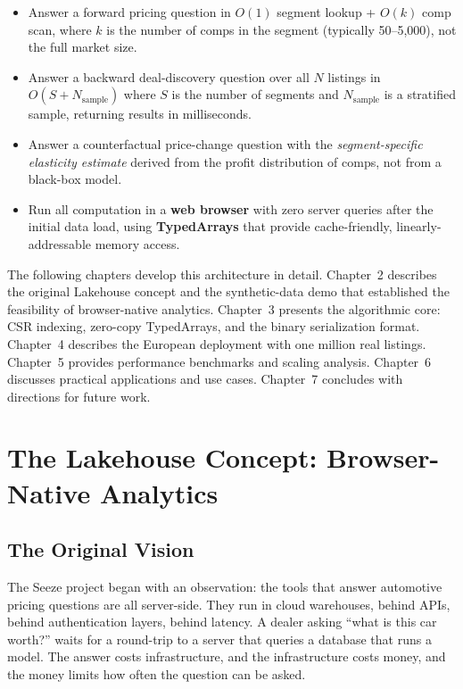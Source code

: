 \documentclass[11pt,a4paper,twoside]{book}
\begin{document}
\begin{itemize}[leftmargin=*]
    \item Answer a forward pricing question in $O(1)$ segment lookup + $O(k)$ comp scan, where
          $k$ is the number of comps in the segment (typically 50--5,000), not the full market
          size.
    \item Answer a backward deal-discovery question over all $N$ listings in $O(S + N_{\text{sample}})$
          where $S$ is the number of segments and $N_{\text{sample}}$ is a stratified sample,
          returning results in milliseconds.
    \item Answer a counterfactual price-change question with the \textit{segment-specific
          elasticity estimate} derived from the profit distribution of comps, not from a
          black-box model.
    \item Run all computation in a \textbf{web browser} with zero server queries after the
          initial data load, using \textbf{TypedArrays} that provide cache-friendly,
          linearly-addressable memory access.
\end{itemize}

The following chapters develop this architecture in detail. Chapter~2 describes the original
Lakehouse concept and the synthetic-data demo that established the feasibility of browser-native
analytics. Chapter~3 presents the algorithmic core: CSR indexing, zero-copy TypedArrays, and the
binary serialization format. Chapter~4 describes the European deployment with one million real
listings. Chapter~5 provides performance benchmarks and scaling analysis. Chapter~6 discusses
practical applications and use cases. Chapter~7 concludes with directions for future work.

\chapter{The Lakehouse Concept: Browser-Native Analytics}

\section{The Original Vision}

The Seeze project began with an observation: the tools that answer automotive pricing questions
are all server-side. They run in cloud warehouses, behind APIs, behind authentication layers,
behind latency. A dealer asking ``what is this car worth?'' waits for a round-trip to a server
that queries a database that runs a model. The answer costs infrastructure, and the infrastructure
costs money, and the money limits how often the question can be asked.
\end{document}
